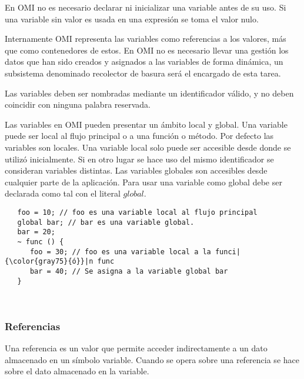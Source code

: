 En OMI no es necesario declarar ni inicializar una variable antes de su uso. Si una variable sin valor es usada en una expresión se toma el valor nulo.

Internamente OMI representa las variables como referencias a los valores, más que como contenedores de estos. En OMI no es necesario llevar una gestión los datos que han sido
creados y asignados a las variables de forma dinámica, un subsistema denominado recolector de basura será el encargado de esta tarea.

Las variables deben ser nombradas mediante un identificador válido, y no deben coincidir con ninguna palabra reservada. 

Las variables en OMI pueden presentar un ámbito local y global. Una variable puede ser local al flujo principal o a una función o método. Por defecto las variables son locales.
Una variable local solo puede ser accesible desde donde se utilizó inicialmente. Si en otro lugar se hace uso del mismo identificador se consideran variables distintas.
Las variables globales son accesibles desde cualquier parte de la aplicación. Para usar una variable como global debe ser declarada como tal con el literal $global$. \\


\begin{lstlisting}
   foo = 10; // foo es una variable local al flujo principal
   global bar; // bar es una variable global.
   bar = 20; 
   ~ func () {
      foo = 30; // foo es una variable local a la funci|{\color{gray75}{ó}}|n func
      bar = 40; // Se asigna a la variable global bar
   }
\end{lstlisting}
\hfill\\



\subsubsection{Referencias}
Una referencia es un valor que permite acceder indirectamente a un dato almacenado en un símbolo variable. Cuando 
se opera sobre una referencia se hace sobre el dato almacenado en la variable.

